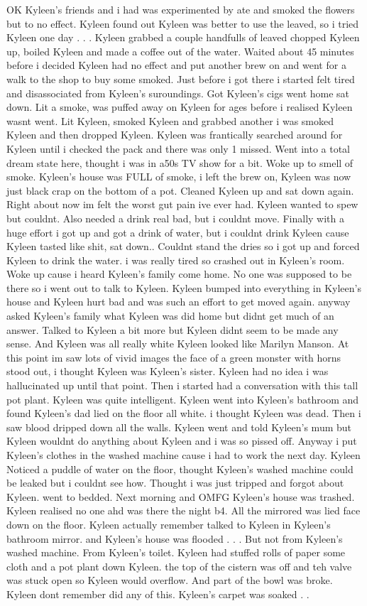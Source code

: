 \documentclass[12pt]{book}
\begin{document}
OK Kyleen's friends and i had was experimented by ate and smoked the flowers but to no effect. Kyleen found out Kyleen was better to use the leaved, so i tried Kyleen one day . . .  Kyleen grabbed a couple handfulls of leaved chopped Kyleen up, boiled Kyleen and made a coffee out of the water. Waited about 45 minutes before i decided Kyleen had no effect and put another brew on and went for a walk to the shop to buy some smoked. Just before i got there i started felt tired and disassociated from Kyleen's suroundings. Got Kyleen's cigs went home sat down. Lit a smoke, was puffed away on Kyleen for ages before i realised Kyleen wasnt went. Lit Kyleen, smoked Kyleen and grabbed another i was smoked Kyleen and then dropped Kyleen. Kyleen was frantically searched around for Kyleen until i checked the pack and there was only 1 missed. Went into a total dream state here, thought i was in a50s TV show for a bit. Woke up to smell of smoke. Kyleen's house was FULL of smoke, i left the brew on, Kyleen was now just black crap on the bottom of a pot. Cleaned Kyleen up and sat down again. Right about now im felt the worst gut pain ive ever had. Kyleen wanted to spew but couldnt. Also needed a drink real bad, but i couldnt move. Finally with a huge effort i got up and got a drink of water, but i couldnt drink Kyleen cause Kyleen tasted like shit, sat down.. Couldnt stand the dries so i got up and forced Kyleen to drink the water. i was really tired so crashed out in Kyleen's room. Woke up cause i heard Kyleen's family come home. No one was supposed to be there so i went out to talk to Kyleen. Kyleen bumped into everything in Kyleen's house and Kyleen hurt bad and was such an effort to get moved again. anyway asked Kyleen's family what Kyleen was did home but didnt get much of an answer. Talked to Kyleen a bit more but Kyleen didnt seem to be made any sense. And Kyleen was all really white Kyleen looked like Marilyn Manson. At this point im saw lots of vivid images the face of a green monster with horns stood out, i thought Kyleen was Kyleen's sister. Kyleen had no idea i was hallucinated up until that point. Then i started had a conversation with this tall pot plant. Kyleen was quite intelligent. Kyleen went into Kyleen's bathroom and found Kyleen's dad lied on the floor all white. i thought Kyleen was dead. Then i saw blood dripped down all the walls. Kyleen went and told Kyleen's mum but Kyleen wouldnt do anything about Kyleen and i was so pissed off. Anyway i put Kyleen's clothes in the washed machine cause i had to work the next day. Kyleen Noticed a puddle of water on the floor, thought Kyleen's washed machine could be leaked but i couldnt see how. Thought i was just tripped and forgot about Kyleen. went to bedded. Next morning and OMFG Kyleen's house was trashed. Kyleen realised no one ahd was there the night b4. All the mirrored was lied face down on the floor. Kyleen actually remember talked to Kyleen in Kyleen's bathroom mirror. and Kyleen's house was flooded . . .  But not from Kyleen's washed machine. From Kyleen's toilet. Kyleen had stuffed rolls of paper some cloth and a pot plant down Kyleen. the top of the cistern was off and teh valve was stuck open so Kyleen would overflow. And part of the bowl was broke. Kyleen dont remember did any of this. Kyleen's carpet was soaked . . 
\end{document}
